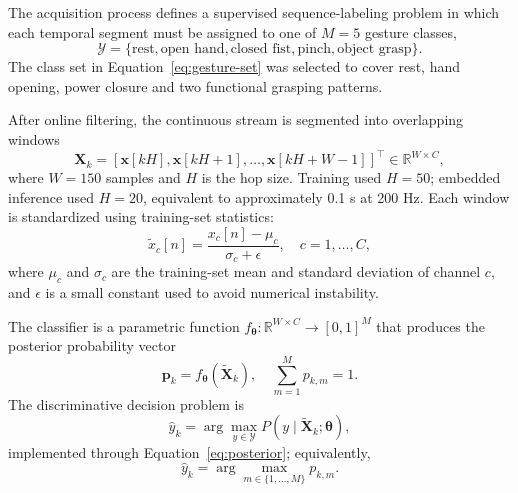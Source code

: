 \documentclass[technologies,article,submit,pdftex,moreauthors]{Definitions/mdpi}
\begin{document}
The acquisition process defines a supervised sequence-labeling problem in which each temporal segment must be assigned to one of $M=5$ gesture classes,
\begin{equation}
    \label{eq:gesture-set}
    \mathcal{Y}=\{\text{rest}, \text{open hand}, \text{closed fist}, \text{pinch}, \text{object grasp}\}.
\end{equation}
The class set in Equation~\eqref{eq:gesture-set} was selected to cover rest, hand opening, power closure and two functional grasping patterns.

After online filtering, the continuous stream is segmented into overlapping windows
\begin{equation}
    \label{eq:windowing}
    \mathbf{X}_k =
    \left[
    \mathbf{x}[kH],\mathbf{x}[kH+1],\ldots,\mathbf{x}[kH+W-1]
    \right]^{\top}
    \in \mathbb{R}^{W \times C},
\end{equation}
where $W=150$ samples and $H$ is the hop size. Training used $H=50$; embedded inference used $H=20$, equivalent to approximately 0.1 s at 200 Hz. Each window is standardized using training-set statistics:
\begin{equation}
    \label{eq:zscore}
    \tilde{x}_{c}[n]=\frac{x_c[n]-\mu_c}{\sigma_c+\epsilon},
    \quad c=1,\ldots,C,
\end{equation}
where $\mu_c$ and $\sigma_c$ are the training-set mean and standard deviation of channel $c$, and $\epsilon$ is a small constant used to avoid numerical instability.

The classifier is a parametric function $f_{\boldsymbol{\theta}}:\mathbb{R}^{W\times C}\rightarrow[0,1]^M$ that produces the posterior probability vector
\begin{equation}
    \label{eq:posterior}
    \mathbf{p}_k=f_{\boldsymbol{\theta}}(\tilde{\mathbf{X}}_k),
    \quad
    \sum_{m=1}^{M}p_{k,m}=1.
\end{equation}
The discriminative decision problem is
\begin{equation}
    \label{eq:bayes-decision}
    \hat{y}_k
    =
    \arg\max_{y\in\mathcal{Y}}
    P\left(y\mid \tilde{\mathbf{X}}_k;\boldsymbol{\theta}\right),
\end{equation}
implemented through Equation~\eqref{eq:posterior}; equivalently,
\begin{equation}
    \label{eq:argmax}
    \hat{y}_k = \arg\max_{m \in \{1,\ldots,M\}} p_{k,m}.
\end{equation}
\end{document}
